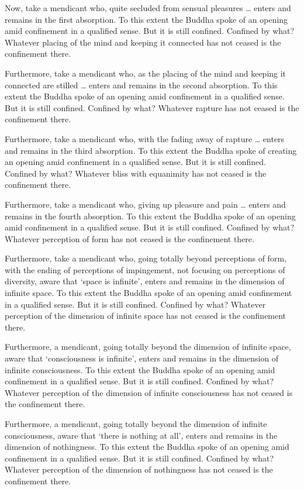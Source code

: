 \documentclass[12pt,openany]{book}%
\begin{document}
Now, take a mendicant who, quite secluded from sensual pleasures … enters and remains in the first absorption. To this extent the Buddha spoke of an opening amid confinement in a qualified sense. But it is still confined. Confined by what? Whatever placing of the mind and keeping it connected has not ceased is the confinement there. 

Furthermore, take a mendicant who, as the placing of the mind and keeping it connected are stilled … enters and remains in the second absorption. To this extent the Buddha spoke of an opening amid confinement in a qualified sense. But it is still confined. Confined by what? Whatever rapture has not ceased is the confinement there. 

Furthermore, take a mendicant who, with the fading away of rapture … enters and remains in the third absorption. To this extent the Buddha spoke of creating an opening amid confinement in a qualified sense. But it is still confined. Confined by what? Whatever bliss with equanimity has not ceased is the confinement there. 

Furthermore, take a mendicant who, giving up pleasure and pain … enters and remains in the fourth absorption. To this extent the Buddha spoke of an opening amid confinement in a qualified sense. But it is still confined. Confined by what? Whatever perception of form has not ceased is the confinement there. 

Furthermore, take a mendicant who, going totally beyond perceptions of form, with the ending of perceptions of impingement, not focusing on perceptions of diversity, aware that ‘space is infinite’, enters and remains in the dimension of infinite space. To this extent the Buddha spoke of an opening amid confinement in a qualified sense. But it is still confined. Confined by what? Whatever perception of the dimension of infinite space has not ceased is the confinement there. 

Furthermore, a mendicant, going totally beyond the dimension of infinite space, aware that ‘consciousness is infinite’, enters and remains in the dimension of infinite consciousness. To this extent the Buddha spoke of an opening amid confinement in a qualified sense. But it is still confined. Confined by what? Whatever perception of the dimension of infinite consciousness has not ceased is the confinement there. 

Furthermore, a mendicant, going totally beyond the dimension of infinite consciousness, aware that ‘there is nothing at all’, enters and remains in the dimension of nothingness. To this extent the Buddha spoke of an opening amid confinement in a qualified sense. But it is still confined. Confined by what? Whatever perception of the dimension of nothingness has not ceased is the confinement there. 
\end{document}
